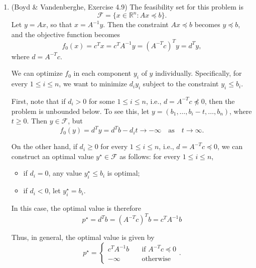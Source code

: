 \documentclass[letterpaper,12pt]{article}
\begin{document}
\begin{enumerate}
\begin{enumerate}
\end{enumerate}

\item (Boyd \& Vandenberghe, Exercise 4.9) The feasibility set for
  this problem is
  \begin{equation*}
    \mathcal{F} = \{x \in \mathbb{R}^n : Ax \preceq b\}.
  \end{equation*}
  Let $y = Ax$, so that $x = A^{-1}y$. Then the constraint
  $Ax \preceq b$ becomes $y \preceq b$, and the objective function
  becomes
  \begin{equation*}
    f_0(x) = c^T x = c^T A^{-1} y = (A^{-T} c)^T y = d^T y,
  \end{equation*}
  where $d = A^{-T} c$.

  We can optimize $f_0$ in each component $y_i$ of $y$
  individually. Specifically, for every $1 \leq i \leq n$, we want to
  minimize $d_i y_i$ subject to the constraint $y_i \leq b_i$.

  First, note that if $d_i > 0$ for some $1 \leq i \leq n$, i.e.,
  $d = A^{-T} c \not \preceq 0$, then the problem is unbounded
  below. To see this, let $y = (b_1, \ldots, b_i - t, \ldots, b_n)$,
  where $t \geq 0$. Then $y \in \mathcal{F}$, but
  \begin{equation*}
    f_0(y) = d^T y = d^T b - d_i t \to -\infty
      \quad \text{as} \quad t \to \infty.
  \end{equation*}

  On the other hand, if $d_i \geq 0$ for every $1 \leq i \leq n$,
  i.e., $d = A^{-T} c \preceq 0$, we can construct an optimal value
  $y^\star \in \mathcal{F}$ as follows: for every $1 \leq i \leq n$,
  \begin{itemize}
  \item if $d_i = 0$, any value $y^\star_i \leq b_i$ is optimal;
  \item if $d_i < 0$, let $y^\star_i = b_i$.
  \end{itemize}
  In this case, the optimal value is therefore
  \begin{equation*}
    p^\star = d^T b = (A^{-T} c)^T b = c^T A^{-1} b
  \end{equation*}

  Thus, in general, the optimal value is given by
  \begin{equation*}
    p^\star = \begin{cases}
      c^T A^{-1} b &\quad \text{if $A^{-T} c \preceq 0$} \\
      -\infty &\quad \text{otherwise}
    \end{cases}.
  \end{equation*}


\end{enumerate}
\end{document}
